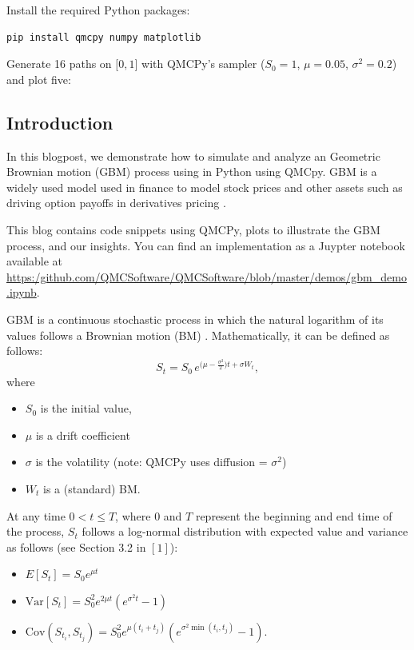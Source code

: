 
\begin{tcolorbox}[title=Example implementation of GBM using QMCPy,colback=blue!1,colframe=blue!30!black,breakable]
Install the required Python packages:
%
\begin{lstlisting}[language=bash,basicstyle=\ttfamily,frame=none,numbers=none]
    pip install qmcpy numpy matplotlib
\end{lstlisting}

Generate 16 paths on $\lbrack 0,1\rbrack$ with QMCPy's sampler  ($S_0=1$,
$\mu=0.05$, $\sigma^2=0.2$) and plot five:
%

\end{tcolorbox}


\subsection{Introduction}

In this blogpost, we demonstrate how to simulate and analyze an Geometric
Brownian motion (GBM) process using in Python using QMCpy. GBM is a widely used
model used in finance to model stock prices and other assets such as driving
option payoffs in derivatives pricing \cite{hull2017, ross2014}. 
 
This blog contains code snippets using QMCPy, plots to illustrate the GBM
process, and our insights. You can find an implementation as a Juypter notebook
available at
\href{gbm\_demo.ipynb}{\url{https:/github.com/QMCSoftware/QMCSoftware/blob/master/demos/gbm\_demo.ipynb}}.

GBM is a continuous stochastic process in which the natural logarithm of its
values follows a Brownian motion (BM) \cite{Gla03}. Mathematically, it can be
defined as follows:
\begin{equation}
S_t = S_0 \, e^{\bigl(\mu - \tfrac{\sigma^2}{2}\bigr)  t + \sigma W_t}, \label{gbm}
\end{equation}
where
\begin{itemize}
\item $S_0$ is the initial value, 
\item $\mu$ is a drift coefficient
\item $\sigma$ is the volatility (note: QMCPy uses diffusion = $\sigma^2$)
\item $W_t$ is a (standard) BM.
\end{itemize}

At any time $0 < t \le T$, where $0$ and $T$ represent the beginning and end
time of the process, $S_t$ follows a log-normal distribution with expected value
and variance as follows (see Section 3.2 in $[1]$):
\begin{itemize}
\item
 $E[S_t] = S_0 e^{\mu t}$
\item $\text{Var}[S_t] = S_0^2 e^{2\mu t}(e^{\sigma^2 t} - 1)$
\item   $  
    \text{Cov}(S_{t_i}, S_{t_j}) = S_0^2 e^{\mu(t_i + t_j)} \left(e^{\sigma^2
    \min(t_i, t_j)} - 1\right).$
\end{itemize}

